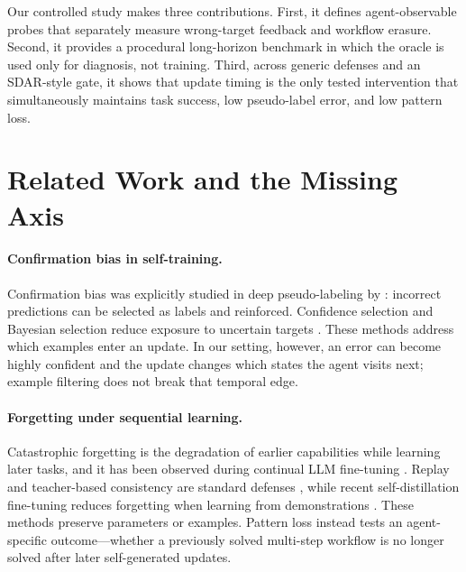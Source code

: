\documentclass[10pt]{article}
\begin{document}
Our controlled study makes three contributions.  First, it defines
agent-observable probes that separately measure wrong-target feedback and
workflow erasure.  Second, it provides a procedural long-horizon benchmark in
which the oracle is used only for diagnosis, not training.  Third, across
generic defenses and an SDAR-style gate, it shows that update timing is the
only tested intervention that simultaneously maintains task success, low
pseudo-label error, and low pattern loss.

\section{Related Work and the Missing Axis}

\paragraph{Confirmation bias in self-training.}
Confirmation bias was explicitly studied in deep pseudo-labeling by
\citet{arazo2020confirmation}: incorrect predictions can be selected as labels
and reinforced.  Confidence selection and Bayesian selection reduce exposure
to uncertain targets \citep{radhakrishnan2023enhancing,rodemann2023bayes}.
These methods address which examples enter an update.  In our setting, however,
an error can become highly confident and the update changes which states the
agent visits next; example filtering does not break that temporal edge.

\paragraph{Forgetting under sequential learning.}
Catastrophic forgetting is the degradation of earlier capabilities while
learning later tasks, and it has been observed during continual LLM
fine-tuning \citep{luo2023forgetting}.  Replay and teacher-based consistency
are standard defenses \citep{tarvainen2017mean,yoo2024lpr}, while recent
self-distillation fine-tuning reduces forgetting when learning from
demonstrations \citep{shenfeld2026sdft}.  These methods preserve parameters or
examples.  Pattern loss instead tests an agent-specific outcome---whether a
previously solved multi-step workflow is no longer solved after later
self-generated updates.
\end{document}
